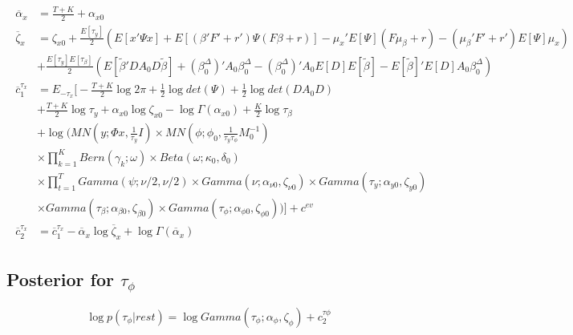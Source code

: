 \documentclass[11pt]{article}
\begin{document}
\begin{align*}
\begin{split}
	\overline{\alpha}_{x}	&=	\frac{T+K}{2}+\alpha_{x0}\\
	\overline{\zeta}_{x}	&=	\zeta_{x0}+\frac{E\left[\tau_{y}\right]}{2}\left(E\left[x'\Psi x\right]+E\left[\left(\beta'F'+r'\right)\Psi\left(F\beta+r\right)\right]-\mu_{x}'E\left[\Psi\right]\left(F\mu_{\beta}+r\right)-\left(\mu_{\beta}'F'+r'\right)E\left[\Psi\right]\mu_{x}\right)\\
					&+\frac{E\left[\tau_{y}\right]E\left[\tau_{\beta}\right]}{2}\left(E\left[\tilde{\beta}'DA_{0}D\tilde{\beta}\right]+\left(\beta_{0}^{\Delta}\right)'A_{0}\beta_{0}^{\Delta}-\left(\beta_{0}^{\Delta}\right)'A_{0}E\left[D\right]E\left[\tilde{\beta}\right]-E\left[\tilde{\beta}\right]'E\left[D\right]A_{0}\beta_{0}^{\Delta}\right)\\
	\overline{c}_{1}^{\tau_{x}}
					&=	E_{-\tau_{x}}\Bigg[-\frac{T+K}{2}\log2\pi+\frac{1}{2}\log det\left(\Psi\right)+\frac{1}{2}\log det\left(DA_{0}D\right)\\
					&+\frac{T+K}{2}\log\tau_{y}+\alpha_{x0}\log\zeta_{x0}-\log\Gamma\left(\alpha_{x0}\right)+\frac{K}{2}\log\tau_{\beta}\\
					&+\log\Bigg(MN\left(y;\Phi x,\frac{1}{\tau_{y}}I\right)\times MN\left(\phi;\phi_{0},\frac{1}{\tau_{y}\tau_{\phi}}M_{0}^{-1}\right)\\
					&\times\prod_{k=1}^{K}Bern\left(\gamma_{k};\omega\right)\times Beta\left(\omega;\kappa_{0},\delta_{0}\right)\\
					&\times\prod_{t=1}^{T}Gamma\left(\psi;\nu/2,\nu/2\right)\times Gamma\left(\nu;\alpha_{\nu0},\zeta_{\nu0}\right)\times Gamma\left(\tau_{y};\alpha_{y0},\zeta_{y0}\right)\\
					&\times Gamma\left(\tau_{\beta};\alpha_{\beta0},\zeta_{\beta0}\right)\times Gamma\left(\tau_{\phi};\alpha_{\phi0},\zeta_{\phi0}\right)\Bigg)\Bigg]+c^{ev}\\
	\overline{c}_{2}^{\tau_{x}}
					&=	\overline{c}_{1}^{\tau_{x}}-\overline{\alpha}_{x}\log\overline{\zeta}_{x}+\log\Gamma\left(\overline{\alpha}_{x}\right)
\end{split}
\end{align*}

\subsection{Posterior for $\tau_\phi$}
\begin{equation}
	\log p\left(\tau_{\phi}|rest\right) = \log Gamma\left(\tau_{\phi};\alpha_{\phi},\zeta_{\phi}\right)+c_{2}^{\tau\phi}
\end{equation}
\end{document}

